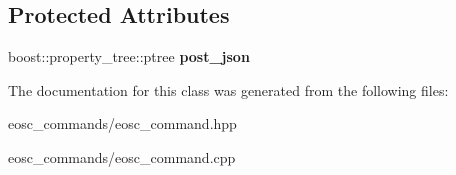 \subsection*{Protected Attributes}
\begin{DoxyCompactItemize}
\item 
\mbox{\label{classtokenika_1_1eosc_1_1eosc__command_a15352c3874eb800e3f53674d3a96d590}} 
boost\+::property\+\_\+tree\+::ptree {\bfseries post\+\_\+json}
\end{DoxyCompactItemize}


The documentation for this class was generated from the following files\+:\begin{DoxyCompactItemize}
\item 
eosc\+\_\+commands/eosc\+\_\+command.\+hpp\item 
eosc\+\_\+commands/eosc\+\_\+command.\+cpp\end{DoxyCompactItemize}

